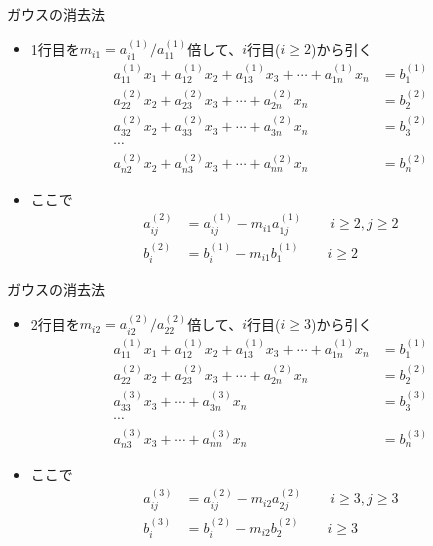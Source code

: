 \begin{frame}[t,fragile]{ガウスの消去法}
  \begin{itemize}
    \setlength{\itemsep}{1em}
  \item 1行目を$m_{i1} = a_{i1}^{(1)}/a_{11}^{(1)}$倍して、$i$行目($i \ge 2$)から引く
    \begin{align*}
    a_{11}^{(1)} x_1 + a_{12}^{(1)} x_2 + a_{13}^{(1)} x_3 + \cdots + a_{1n}^{(1)} x_n &= b_{1}^{(1)} \\
    a_{22}^{(2)} x_2 + a_{23}^{(2)} x_3 + \cdots + a_{2n}^{(2)} x_n &= b_{2}^{(2)} \\
    a_{32}^{(2)} x_2 + a_{33}^{(2)} x_3 + \cdots + a_{3n}^{(2)} x_n &= b_{3}^{(2)} \\
    \cdots \\
    a_{n2}^{(2)} x_2 + a_{n3}^{(2)} x_3 + \cdots + a_{nn}^{(2)} x_n &= b_{n}^{(2)}
    \end{align*}
  \item ここで
    \begin{align*}
      a_{ij}^{(2)} &= a_{ij}^{(1)} - m_{i1} a_{1j}^{(1)} \qquad i \ge 2, j \ge 2 \\
      b_{i}^{(2)} &= b_{i}^{(1)} - m_{i1} b_{1}^{(1)} \qquad i \ge 2
    \end{align*}
  \end{itemize}
\end{frame}

\begin{frame}[t,fragile]{ガウスの消去法}
  \begin{itemize}
    \setlength{\itemsep}{1em}
  \item 2行目を$m_{i2} = a_{i2}^{(2)}/a_{22}^{(2)}$倍して、$i$行目($i \ge 3$)から引く
    \begin{align*}
    a_{11}^{(1)} x_1 + a_{12}^{(1)} x_2 + a_{13}^{(1)} x_3 + \cdots + a_{1n}^{(1)} x_n &= b_{1}^{(1)} \\
    a_{22}^{(2)} x_2 + a_{23}^{(2)} x_3 + \cdots + a_{2n}^{(2)} x_n &= b_{2}^{(2)} \\
    a_{33}^{(3)} x_3 + \cdots + a_{3n}^{(3)} x_n &= b_{3}^{(3)} \\
    \cdots \\
    a_{n3}^{(3)} x_3 + \cdots + a_{nn}^{(3)} x_n &= b_{n}^{(3)}
    \end{align*}
  \item ここで
    \begin{align*}
      a_{ij}^{(3)} &= a_{ij}^{(2)} - m_{i2} a_{2j}^{(2)} \qquad i \ge 3, j \ge 3 \\
      b_{i}^{(3)} &= b_{i}^{(2)} - m_{i2} b_{2}^{(2)} \qquad i \ge 3
    \end{align*}
  \end{itemize}
\end{frame}

